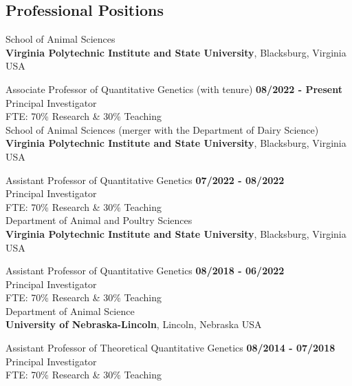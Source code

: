 \documentclass[margin,line,10pt]{res}
\begin{document}
\begin{resume}
\vspace{0.4cm}
\section{\sc Professional Positions}


School of Animal Sciences\\
{\bf Virginia Polytechnic Institute and State University}, Blacksburg, Virginia USA
\vspace{-.3cm}

Associate Professor of Quantitative Genetics (with tenure)  \hfill {\bf 08/2022 - Present}\\
Principal Investigator \\
FTE: 70\% Research \& 30\% Teaching \\


School of Animal Sciences (merger with the Department of Dairy Science)\\
{\bf Virginia Polytechnic Institute and State University}, Blacksburg, Virginia USA
\vspace{-.3cm}

Assistant Professor of Quantitative Genetics   \hfill {\bf 07/2022 - 08/2022}\\
Principal Investigator \\
FTE: 70\% Research \& 30\% Teaching \\


Department of Animal and Poultry Sciences\\
{\bf Virginia Polytechnic Institute and State University}, Blacksburg, Virginia USA
\vspace{-.3cm}

Assistant Professor of Quantitative Genetics   \hfill {\bf 08/2018 - 06/2022}\\
Principal Investigator \\
FTE: 70\% Research \& 30\% Teaching \\



Department of Animal Science\\
{\bf University of Nebraska-Lincoln}, Lincoln, Nebraska USA
\vspace{-.35cm}

Assistant Professor of Theoretical Quantitative Genetics   \hfill {\bf 08/2014 - 07/2018}\\
Principal Investigator \\
FTE: 70\% Research \& 30\% Teaching \\





\end{resume}
\end{document}
